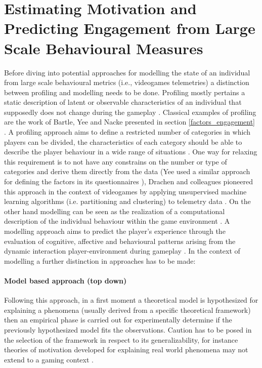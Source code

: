 \section{Estimating Motivation and Predicting Engagement from Large Scale Behavioural Measures}
\label{estpred_motivation_engagement}
Before diving into potential approaches for modelling the state of an individual from large scale behavioural metrics (i.e., videogames telemetries) a distinction between profiling and modelling needs to be done. Profiling mostly pertains a static description of latent or observable characteristics of an individual that supposedly does not change during the gameplay \cite{yannakakis2013player}. Classical examples of profiling are the work of Bartle, Yee and Nacke presented in section \ref{factors_engagement} \cite{bartle1996hearts, yee2006motivations, nacke2011brainhex}. A profiling approach aims to define a restricted number of categories in which players can be divided, the characteristics of each category should be able to describe the player behaviour in a wide range of situations \cite{yannakakis2013player, van2009psychologically, van2011games}. One way for relaxing this requirement is to not have any constrains on the number or type of categories and derive them directly from the data (Yee used a similar approach for defining the factors in its questionnaires \cite{yee2006motivations}), Drachen and colleagues pioneered this approach in the context of videogames by applying unsupervised machine learning algorithms (i.e. partitioning and clustering) to telemetry data \cite{tychsen2008defining,drachen2009player, drachen2012guns}. On the other hand modelling can be seen as the realization of a computational description of the individual behaviour within the game environment \cite{yannakakis2013player}. A modelling approach aims to predict the player’s experience through the evaluation of cognitive, affective and behavioural patterns arising from the dynamic interaction player-environment during gameplay \cite{yannakakis2013player}. In the context of modelling a further distinction in approaches has to be made:

\paragraph*{Model based approach (top down)} Following this approach, in a first moment a theoretical model is hypothesized for explaining a phenomena (usually derived from a specific theoretical framework) then an empirical phase is carried out for experimentally determine if the previously hypothesized model fits the observations. Caution has to be posed in the selection of the framework in respect to its generalizability, for instance theories of motivation developed for explaining real world phenomena may not extend to a gaming context \cite{yannakakis2013player}.

